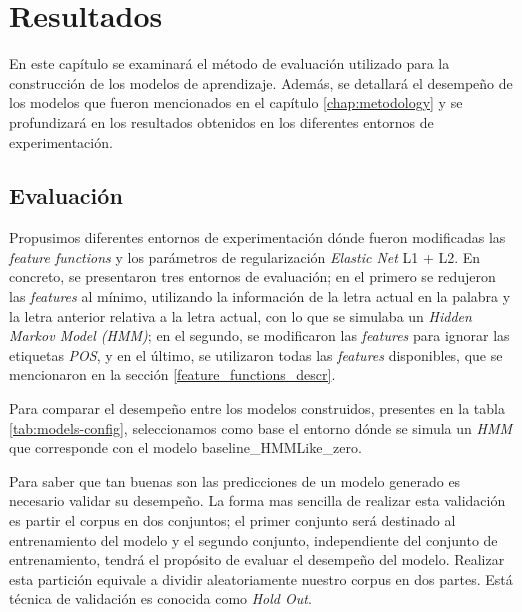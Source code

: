 \documentclass[letterpaper,12pt,oneside]{book}
\theoremstyle{definition}
\begin{document}
\chapter{Resultados}

En este capítulo se examinará el método de evaluación utilizado para la construcción de los modelos de aprendizaje. Además, se detallará el desempeño de los modelos que fueron mencionados en el capítulo \ref{chap:metodology} y se profundizará en los resultados obtenidos en los diferentes entornos de experimentación. 


\section{Evaluación}

Propusimos diferentes entornos de experimentación dónde fueron modificadas las \textit{feature functions} y los parámetros de regularización \textit{Elastic Net} L1 + L2. En concreto, se presentaron tres entornos de evaluación; en el primero se redujeron las \textit{features} al mínimo, utilizando la información de la letra actual en la palabra y la letra anterior relativa a la letra actual, con lo que se simulaba un \textit{Hidden Markov Model (HMM)}; en el segundo, se modificaron las \textit{features} para ignorar las etiquetas \textit{POS}, y en el último, se utilizaron todas las \textit{features} disponibles, que se mencionaron en la sección \ref{feature_functions_descr}.

Para comparar el desempeño entre los modelos construidos, presentes en la tabla \ref{tab:models-config}, seleccionamos como base el entorno dónde se simula un \textit{HMM} que corresponde con el modelo \textsf{baseline\_HMMLike\_zero}.

Para saber que tan buenas son las predicciones de un modelo generado es necesario validar su desempeño. La forma mas sencilla de realizar esta validación es partir el corpus en dos conjuntos; el primer conjunto será destinado al entrenamiento del modelo y el segundo conjunto, independiente del conjunto de entrenamiento, tendrá el propósito de evaluar el desempeño del modelo. Realizar esta partición equivale a dividir aleatoriamente nuestro corpus en dos partes. Está técnica de validación es conocida como \textit{Hold Out}.
\end{document}
